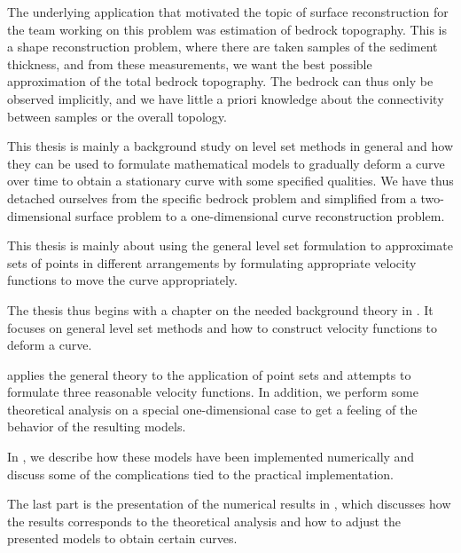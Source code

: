 The underlying application that motivated the topic of surface reconstruction for the team working on this problem was estimation of bedrock topography. This is a shape reconstruction problem, where there are taken samples of the sediment thickness, and from these measurements, we want the best possible approximation of the total bedrock topography. The bedrock can thus only be observed implicitly, and we have little a priori knowledge about the connectivity between samples or the overall topology.

This thesis is mainly a background study on level set methods in general and how they can be used to formulate mathematical models to gradually deform a curve over time to obtain a stationary curve with some specified qualities. We have thus detached ourselves from the specific bedrock problem and simplified from a two-dimensional surface problem to a one-dimensional curve reconstruction problem.

This thesis is mainly about using the general level set formulation to approximate sets of points in different arrangements by formulating appropriate velocity functions to move the curve appropriately. 

The thesis thus begins with a chapter on the needed background theory in . It focuses on general level set methods and how to construct velocity functions to deform a curve. 

 applies the general theory to the application of point sets and attempts to formulate three reasonable velocity functions. In addition, we perform some theoretical analysis on a special one-dimensional case to get a feeling of the behavior of the resulting models. 

In , we describe how these models have been implemented numerically and discuss some of the complications tied to the practical implementation.

The last part is the presentation of the numerical results in , which discusses how the results corresponds to the theoretical analysis and how to adjust the presented models to obtain certain curves. 



